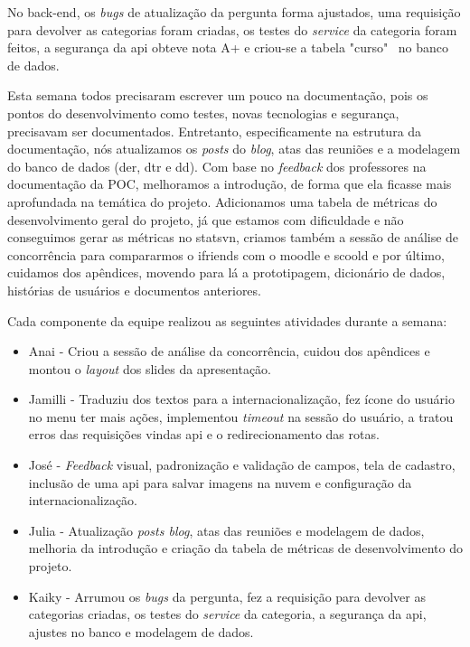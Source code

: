 No \gls{back-end}, os \textit{bugs} de atualização da pergunta forma ajustados, uma requisição para devolver as categorias foram criadas, os testes do \textit{service} da categoria foram feitos, a segurança da \acs{api} obteve nota A+ e criou-se a tabela "curso" \, no banco de dados.

Esta semana todos precisaram escrever um pouco na documentação, pois os pontos do desenvolvimento como testes, novas tecnologias e segurança, precisavam ser documentados. Entretanto, especificamente na estrutura da documentação, nós atualizamos os \textit{posts} do \textit{blog}, atas das reuniões e a modelagem do banco de dados (\acs{der}, \acs{dtr} e \acs{dd}). Com base no \textit{feedback} dos professores na documentação da \acs{POC},  melhoramos a introdução, de forma que ela ficasse mais aprofundada na temática do projeto. Adicionamos uma tabela de métricas do desenvolvimento geral do projeto, já que estamos com dificuldade e não conseguimos gerar as métricas no \gls{statsvn}, criamos também a sessão de análise de concorrência para compararmos o \gls{ifriends} com o \gls{moodle} e \gls{scoold} e por último, cuidamos dos apêndices, movendo para lá a prototipagem, dicionário de dados, histórias de usuários e documentos anteriores.

Cada componente da equipe realizou as seguintes atividades durante a semana:

\begin{itemize}
    \item Anai - Criou a sessão de análise da concorrência, cuidou dos apêndices e montou o \textit{layout} dos slides da apresentação.  
    \item Jamilli - Traduziu dos textos para  a internacionalização, fez ícone do usuário no menu ter mais ações, implementou \textit{timeout} na sessão do usuário, a tratou erros das requisições vindas \acs{api} e o redirecionamento das rotas.
    \item José - \textit{Feedback} visual, padronização e validação de campos, tela de cadastro, inclusão de uma \acs{api} para salvar imagens na nuvem e configuração da internacionalização.  
    \item Julia - Atualização \textit{posts blog}, atas das reuniões e modelagem de dados, melhoria da introdução e criação da tabela de métricas de desenvolvimento do projeto.
    \item Kaiky - Arrumou os \textit{bugs} da pergunta, fez a requisição para devolver as categorias criadas, os testes do \textit{service} da categoria, a segurança da \acs{api}, ajustes no banco e modelagem de dados. 
\end{itemize}

